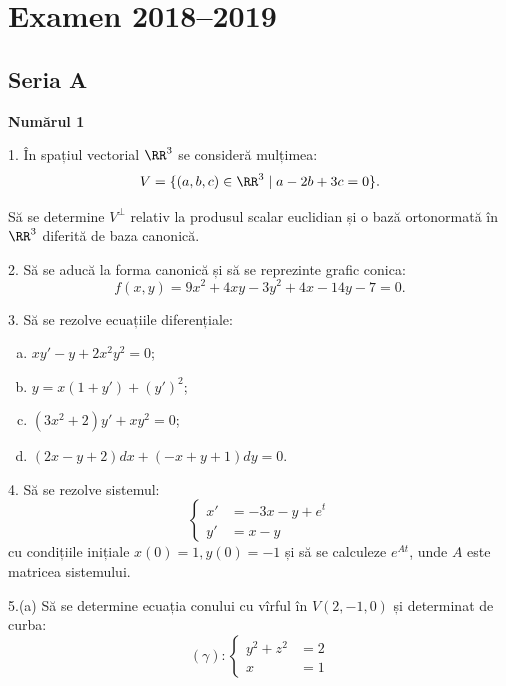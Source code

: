 
\chapter{Examen 2018--2019}

\section{Seria A}

\textbf{Numărul 1}

1. În spațiul vectorial $ \RR^3 $ se consideră mulțimea:
\[
  V = \{ (a, b, c) \in \RR^3 \mid a - 2b + 3c = 0 \}.
\]

Să se determine $V^\perp$ relativ la produsul scalar euclidian și o
bază ortonormată în $ \RR^3 $ diferită de baza canonică.

\vspace{1cm}

2. Să se aducă la forma canonică și să se reprezinte grafic conica:
\[
  f(x, y) = 9x^2 + 4xy - 3y^2 + 4x - 14y - 7 = 0.
\]


\vspace{1cm}

3. Să se rezolve ecuațiile diferențiale:
\begin{enumerate}[(a)]
  \item $ xy' - y + 2x^2y^2 = 0 $;
  \item $ y = x(1 + y') + (y')^2 $;
  \item $ (3x^2 + 2) y' + xy^2 = 0 $;
  \item $ (2x - y + 2) dx + (-x + y + 1) dy = 0 $.
\end{enumerate}

\vspace{1cm}

4. Să se rezolve sistemul:
\[
  \begin{cases}
    x' &= -3x - y + e^t \\
    y' &= x - y
  \end{cases}
\]
cu condițiile inițiale $ x(0) = 1, y(0) = -1 $ și să se calculeze
$ e^{At}$, unde $ A $ este matricea sistemului.

\vspace{1cm}

5.(a) Să se determine ecuația conului cu vîrful în $ V(2, -1, 0) $ și
determinat de curba\footnotemark:
\[
  (\gamma) : \begin{cases}
    y^2 + z^2 &= 2 \\
    x &= 1
  \end{cases}
\]

